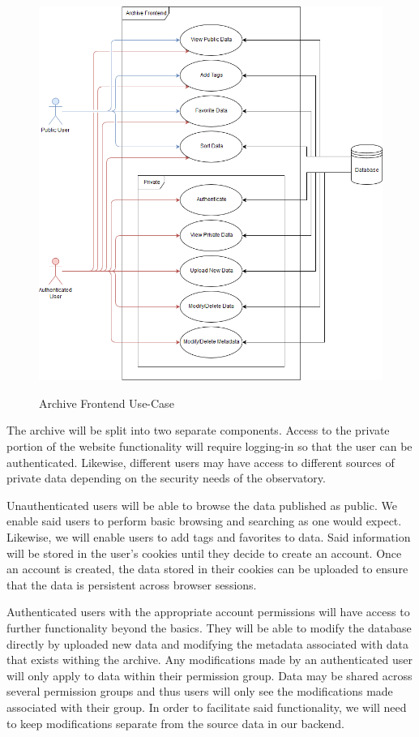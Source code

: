 \documentclass[12pt]{report}
\begin{document}
\begin{figure}[h]
	\centering
	\caption{Archive Frontend Use-Case}
	\includegraphics[width=0.75\linewidth]{frontend_use_case}
	\label{fig:archiveusecase}
\end{figure}

The archive will be split into two separate components. Access to the private portion of the website functionality will require logging-in so that the user can be authenticated. Likewise, different users may have access to different sources of private data depending on the security needs of the observatory.

Unauthenticated users will be able to browse the data published as public. We enable said users to perform basic browsing and searching as one would expect. Likewise, we will enable users to add tags and favorites to data. Said information will be stored in the user's cookies until they decide to create an account. Once an account is created, the data stored in their cookies can be uploaded to ensure that the data is persistent across browser sessions.

Authenticated users with the appropriate account permissions will have access to further functionality beyond the basics. They will be able to modify the database directly by uploaded new data and modifying the metadata associated with data that exists withing the archive. Any modifications made by an authenticated user will only apply to data within their permission group. Data may be shared across several permission groups and thus users will only see the modifications made associated with their group. In order to facilitate said functionality, we will need to keep modifications separate from the source data in our backend.
\end{document}
